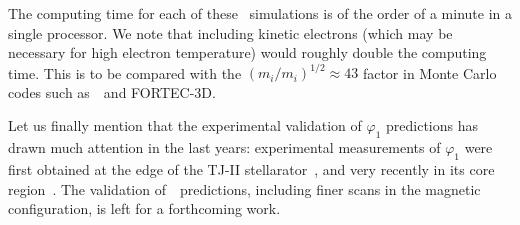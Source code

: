 The computing time for each of these \KNOSOS~simulations is of the order of a minute in a single processor. We note that including kinetic electrons (which may be necessary for high electron temperature) would roughly double the computing time. This is to be compared with the $(m_i/m_i)^{1/2} \approx 43$ factor in Monte Carlo codes such as~\EUTERPE~and {\ttfamily FORTEC-3D}.

Let us finally mention that the experimental validation of $\varphi_1$ predictions has drawn much attention in the last years: experimental measurements of $\varphi_1$ were first obtained at the edge of the TJ-II stellarator~\cite{pedrosa2015phi1}, and very recently in its core region~\citep{estrada2019phi1}. The validation of~\KNOSOS~predictions, including finer scans in the magnetic configuration, is left for a forthcoming work.
